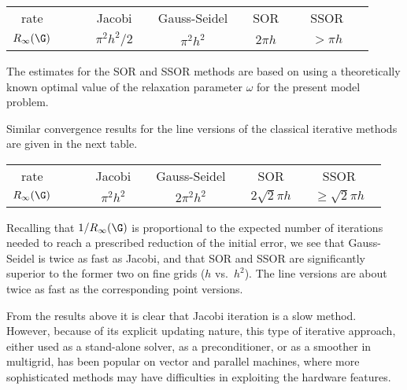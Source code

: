 \vspace{0.3cm}

\begin{center}
\begin{tabular}{cccccc}
\hline\noalign{\smallskip}
rate & \mbox{\ \ \ } & Jacobi  & \mbox{\ \ Gauss-Seidel\ \ } & SOR & \hbox{\ \ \ SSOR\ \ \  } \\
\noalign{\smallskip}
\hline
\noalign{\smallskip}
$R_{\infty}(\G )$ & & $\pi^2h^2/2$ & $\pi^2h^2$ & $2\pi h$ & $>\pi h$\\
\hline
\end{tabular}
\end{center}

\vspace{0.3cm}

\noindent
The estimates for the SOR and SSOR methods are based on using a
theoretically known optimal value of the relaxation parameter $\omega$
for the present model problem.

Similar convergence
results for the line versions of the classical iterative methods
are given in the next table.

\vspace{0.3cm}

\begin{center}
\begin{tabular}{cccccc}
\hline\noalign{\smallskip}
rate & \mbox{\ \ \ } & Jacobi  & \mbox{\ \ Gauss-Seidel\ \ } & SOR & \hbox{\ \ \   SSOR\ \ \   }\\
\noalign{\smallskip}
\hline
\noalign{\smallskip}
$R_{\infty}(\G )$ & & $\pi^2h^2$ & $2\pi^2 h^2$ & $2\sqrt{2}\pi h$ &
$\geq \sqrt{2}\pi h$\\
\hline
\end{tabular}
\end{center}

\vspace{0.3cm}

\noindent
Recalling that $1/R_{\infty}(\G )$ is proportional to the expected
number of iterations needed to reach a prescribed reduction of the
initial error, we see that Gauss-Seidel is twice as fast as Jacobi,
and that SOR and SSOR are significantly superior to the former
two on fine grids
($h$ vs.~$h^2$).
The line versions are about twice
as fast as the corresponding point versions.

From the results above it is clear that Jacobi iteration is a slow method.
However, because of its explicit updating nature,
this type of iterative approach, either used as a stand-alone solver, as
a preconditioner, or as a smoother in multigrid,
has been popular
on vector and parallel machines, where more sophisticated methods
may have difficulties in exploiting the hardware features.


